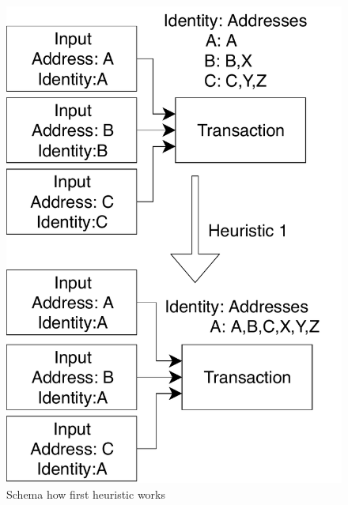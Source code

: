 \documentclass[
  digital, %
  table,   %
  lof,     %
  lot,     %
  oneside
]{fithesis3}
\begin{document}
\begin{figure}[!htb]
    \centering
    \includegraphics[width=1\textwidth]{heur1}
    \caption{Schema how first heuristic works}
    \label{heur1}
\end{figure}
\end{document}
